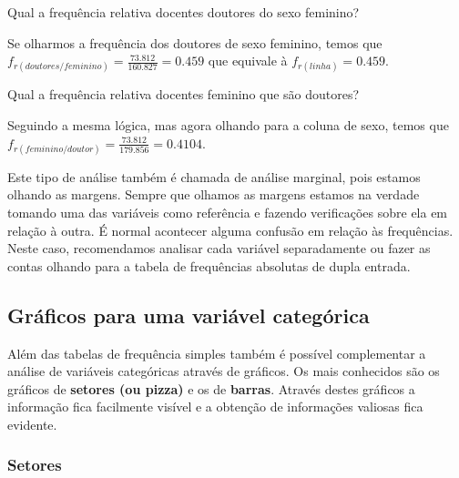 \documentclass[12pt,]{style/krantz}
\theoremstyle{definition}
\theoremstyle{definition}
\theoremstyle{definition}
\theoremstyle{remark}
\let\BeginKnitrBlock\begin \let\EndKnitrBlock\end
\begin{document}
\BeginKnitrBlock{exercise}
\protect\hypertarget{exr:unnamed-chunk-32}{}{\label{exr:unnamed-chunk-32}
}Qual a frequência relativa docentes doutores do sexo feminino?
\EndKnitrBlock{exercise}

\BeginKnitrBlock{solution}
\iffalse{} {Solução. } \fi{}Se olharmos a frequência dos doutores de
sexo feminino, temos que
\(f_{r(doutores/feminino)} = \frac{73.812}{160.827} = 0.459\) que
equivale à \(f_{r(linha)} = 0.459\).
\EndKnitrBlock{solution}

\BeginKnitrBlock{exercise}
\protect\hypertarget{exr:unnamed-chunk-34}{}{\label{exr:unnamed-chunk-34}
}Qual a frequência relativa docentes feminino que são doutores?
\EndKnitrBlock{exercise}

\BeginKnitrBlock{solution}
\iffalse{} {Solução. } \fi{}Seguindo a mesma lógica, mas agora olhando
para a coluna de sexo, temos que
\(f_{r(feminino/doutor)} = \frac{73.812}{179.856} = 0.4104\).
\EndKnitrBlock{solution}

Este tipo de análise também é chamada de análise marginal, pois estamos
olhando as margens. Sempre que olhamos as margens estamos na verdade
tomando uma das variáveis como referência e fazendo verificações sobre
ela em relação à outra. É normal acontecer alguma confusão em relação às
frequências. Neste caso, recomendamos analisar cada variável
separadamente ou fazer as contas olhando para a tabela de frequências
absolutas de dupla entrada.

\subsection{Gráficos para uma variável
categórica}\label{graficos-para-uma-variavel-categorica}

Além das tabelas de frequência simples também é possível complementar a
análise de variáveis categóricas através de gráficos. Os mais conhecidos
são os gráficos de \textbf{setores (ou pizza)} e os de \textbf{barras}.
Através destes gráficos a informação fica facilmente visível e a
obtenção de informações valiosas fica evidente.

\subsubsection{Setores}\label{setores}
\end{document}
